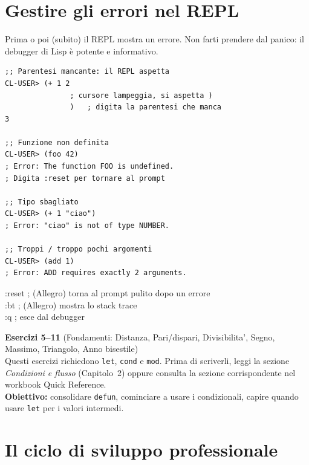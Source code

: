 \section{Gestire gli errori nel REPL}

Prima o poi (subito) il REPL mostra un errore. Non farti prendere dal
panico: il debugger di Lisp è potente e informativo.

\begin{esempio}
\begin{lstlisting}
;; Parentesi mancante: il REPL aspetta
CL-USER> (+ 1 2
               ; cursore lampeggia, si aspetta )
               )   ; digita la parentesi che manca
3

;; Funzione non definita
CL-USER> (foo 42)
; Error: The function FOO is undefined.
; Digita :reset per tornare al prompt

;; Tipo sbagliato
CL-USER> (+ 1 "ciao")
; Error: "ciao" is not of type NUMBER.

;; Troppi / troppo pochi argomenti
CL-USER> (add 1)
; Error: ADD requires exactly 2 arguments.
\end{lstlisting}
\end{esempio}

\begin{sintassi}
:reset    ; (Allegro) torna al prompt pulito dopo un errore\\
:bt       ; (Allegro) mostra lo stack trace\\
:q        ; esce dal debugger
\end{sintassi}

\begin{workbook}
\textbf{Esercizi 5--11} (Fondamenti: Distanza, Pari/dispari, Divisibilita', Segno,
Massimo, Triangolo, Anno bisestile)\\[4pt]
Questi esercizi richiedono \texttt{let}, \texttt{cond} e \texttt{mod}.
Prima di scriverli, leggi la sezione \emph{Condizioni e flusso}
(Capitolo~2) oppure consulta la sezione corrispondente nel workbook
Quick Reference.\\[4pt]
\textbf{Obiettivo:} consolidare \texttt{defun}, cominciare a usare
i condizionali, capire quando usare \texttt{let} per i valori intermedi.
\end{workbook}

\section{Il ciclo di sviluppo professionale}

